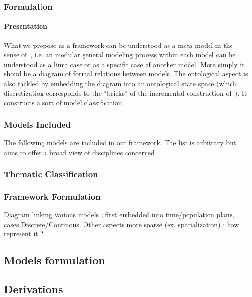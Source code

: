 \subsubsection{Formulation}

\paragraph{Presentation}
What we propose as a framework can be understood as a meta-model in the sense of~\cite{cottineau2015incremental}, i.e. an modular general modeling process within each model can be understood as a limit case or as a specific case of another model. More simply it shoud be a diagram of formal relations between models. The ontological aspect is also tackled by embedding the diagram into an ontological state space (which discretization corresponds to the ``bricks'' of the incremental construction of~\cite{cottineau2015incremental}). It constructs a sort of model classification.

\subsubsection{Models Included}

The following models are included in our framework. The list is arbitrary but aims to offer a broad view of disciplines concerned

\subsubsection{Thematic Classification}


\subsubsection{Framework Formulation}

Diagram linking various models ; first embedded into time/population plane, cases Discrete/Continous. Other aspects more sparse (ex. spatialization) ; how represent it ?

\subsection{Models formulation}



\subsection{Derivations}

